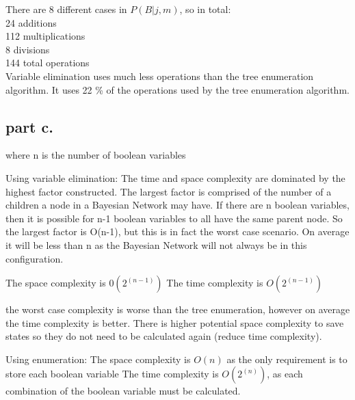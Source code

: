 There are 8 different cases in $P(B|j,m)$, so in total: \\
24 additions \\
112 multiplications \\
8 divisions \\
144 total operations \\

Variable elimination uses much less operations than the tree enumeration algorithm. It uses 22 \% of the operations used by the tree enumeration algorithm.


\subsection{part c.}

where n is the number of boolean variables

Using variable elimination:
The time and space complexity are dominated by the highest factor constructed. The largest factor is comprised of the number of a children a node in a Bayesian Network may have. If there are n boolean variables, then it is possible for n-1 boolean variables to all have the same parent node. So the largest factor is O(n-1), but this is in fact the worst case scenario. On average it will be less than n as the Bayesian Network will not always be in this configuration.

The space complexity is $0(2^{(n-1)})$
The time complexity is $O(2^{(n-1)})$

the worst case complexity is worse than the tree enumeration, however on average the time complexity is better. There is higher potential space complexity to save states so they do not need to be calculated again (reduce time complexity).


Using enumeration:
The space complexity is $O(n)$ as the only requirement is to store each boolean variable
The time complexity is $O(2^(n))$, as each combination of the boolean variable must be calculated.
